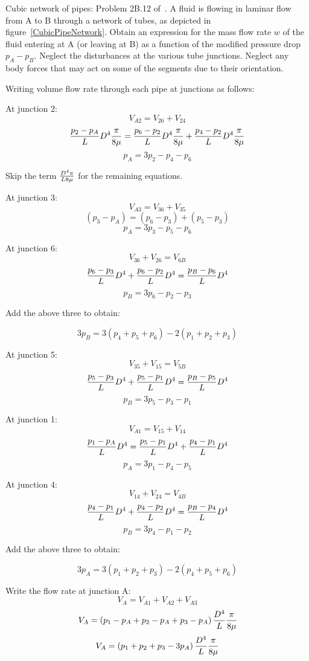 \begin{question}
Cubic network of pipes: Problem 2B.12 of~\cite{bls}. A fluid is flowing in laminar flow from A to B through a network of tubes, as depicted in figure~\ref{CubicPipeNetwork}. Obtain an expression for the mass flow rate $w$ of the fluid entering at A (or leaving at B) as a function of the modified pressure drop $p_A - p_B$. Neglect the disturbances at the various tube junctions. Neglect any body forces that may act on some of the segments due to their orientation.\\
\end{question}
\begin{solution}[print]
Writing volume flow rate through each pipe at junctions as follows:

At junction 2:
$$ V_{A2} = V_{26} + V_{24}$$
	$${p_2 - p_A \over L} D^4 { \pi \over 8 \mu} = {p_6 - p_2 \over L} D^4 {\pi \over 8 \mu}  + {p_4 - p_2 \over L} D^4 {\pi \over 8 \mu} $$
$$ p_A = 3 p_2 -p_4 -p_6 $$

Skip the term $ {D^4 \pi \over L 8 \mu}$ for the remaining equations.

At junction 3:
$$ V_{A3} = V_{36} + V_{35}$$
$$ \left( p_3 - p_A \right) = \left( p_6 - p_3 \right) + \left( p_5 - p_3 \right) $$
$$ p_A = 3 p_3 -p_5 -p_6 $$

At junction 6:
$$ V_{36} + V_{26} = V_{6B}$$
$${p_6 - p_3 \over L} D^4 + {p_6 - p_2 \over L} D^4 = {p_B - p_6 \over L} D^4 $$
$$ p_B = 3 p_6 -p_2 -p_3 $$

Add the above three to obtain:

$$ 3p_B = 3 \left( p_4 + p_5 + p_6 \right) - 2 \left( p_1 + p_2 + p_3\right)$$

At junction 5:
$$ V_{35} + V_{15} = V_{5B}$$
$${p_5 - p_3 \over L} D^4 + {p_5 - p_1 \over L} D^4 = {p_B - p_5 \over L} D^4 $$
$$ p_B = 3 p_5 -p_3 -p_1 $$

At junction 1:
$$ V_{A1} = V_{15} + V_{14}$$
$${p_1 - p_A \over L} D^4 = {p_5 - p_1 \over L} D^4 + {p_4 - p_1 \over L} D^4 $$
$$ p_A = 3 p_1 -p_4 -p_5 $$


At junction 4:
$$ V_{14} + V_{24} = V_{4B}$$
$${p_4 - p_1 \over L} D^4 + {p_4 - p_2 \over L} D^4 = {p_B - p_4 \over L} D^4 $$
$$ p_B = 3 p_4 -p_1 -p_2 $$

Add the above three to obtain:

$$ 3p_A = 3 \left( p_1 + p_2 + p_3 \right) - 2 \left( p_4 + p_5 + p_6\right)$$

Write the flow rate at junction A:
$$ V_A = V_{A1} + V_{A2} + V_{A3}$$
$$ V_A = \left( p_1 - p_A + p_2 - p_A + p_3 - p_A \right) {D^4 \over L} { \pi \over 8 \mu} $$
$$ V_A = \left( p_1 + p_2 + p_3 - 3 p_A \right) {D^4 \over L} { \pi \over 8 \mu} $$


\end{solution}
